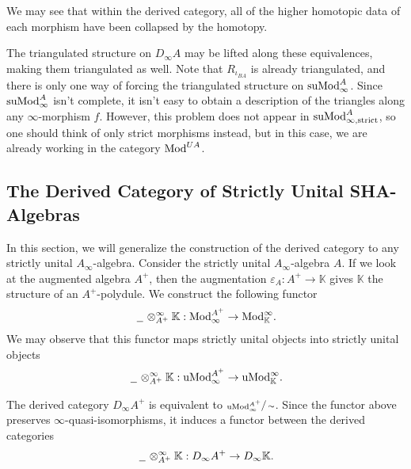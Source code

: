 \documentclass[../thesis.tex]{subfiles}
\begin{document}
            We may see that within the derived category, all of the higher homotopic data of each morphism have been collapsed by the homotopy.

            The triangulated structure on $D_\infty A$ may be lifted along these equivalences, making them triangulated as well. Note that $R_{\iota_{BA}}$ is already triangulated, and there is only one way of forcing the triangulated structure on $\tt{suMod}_\infty^A$. Since $\tt{suMod}_{\infty}^A$ isn't complete, it isn't easy to obtain a description of the triangles along any $\infty$-morphism $f$. However, this problem does not appear in $\tt{suMod}_{\infty, \tt{strict}}^A$, so one should think of only strict morphisms instead, but in this case, we are already working in the category $\tt{Mod}^{UA}$. 

        \subsection{The Derived Category of Strictly Unital SHA-Algebras}

            In this section, we will generalize the construction of the derived category to any strictly unital $A_\infty$-algebra. Consider the strictly unital $A_\infty$-algebra $A$. If we look at the augmented algebra $A^+$, then the augmentation $\varepsilon_A: A^+ \rightarrow \mathbb{K}$ gives $\mathbb{K}$ the structure of an $A^+$-polydule. We construct the following functor
            \begin{align*}
                \argument\otimes_{A^+}^\infty\mathbb{K} : \tt{Mod}_\infty^{A^+} \rightarrow \tt{Mod}_\mathbb{K}^\infty\tt{.}
            \end{align*}
            We may observe that this functor maps strictly unital objects into strictly unital objects
            \begin{align*}
                \argument\otimes_{A^+}^\infty\mathbb{K} : \tt{uMod}_\infty^{A^+} \rightarrow \tt{uMod}_\mathbb{K}^\infty\tt{.}
            \end{align*}

            The derived category $D_\infty A^+$ is equivalent to $\sfrac{\tt{uMod}_\infty^{A^+}}{\sim}$. Since the functor above preserves $\infty$-quasi-isomorphisms, it induces a functor between the derived categories
            \begin{align*}
                \argument\otimes_{A^+}^\infty\mathbb{K} : D_\infty A^+ \rightarrow D_\infty \mathbb{K}\tt{.}
            \end{align*}
\end{document}
